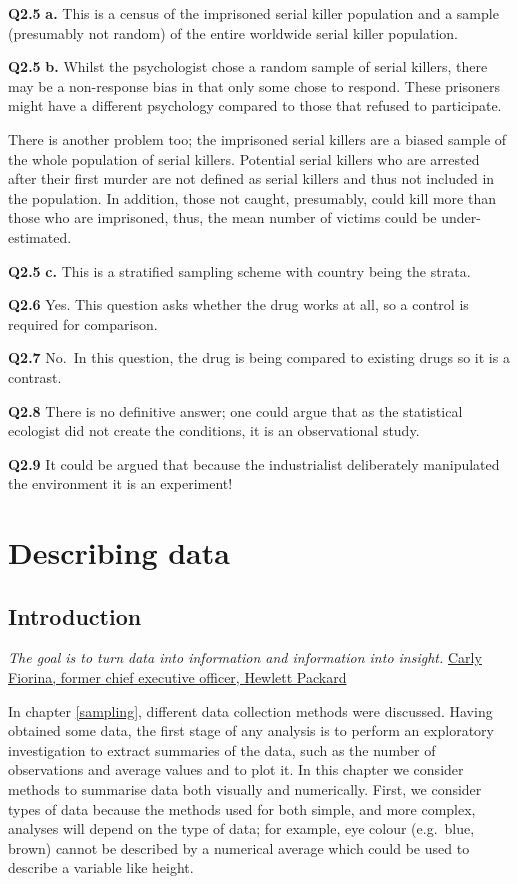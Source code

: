 \documentclass[
  oneside]{krantz}
\begin{document}
\textbf{Q2.5} \textbf{a.} This is a census of the imprisoned serial killer population and a sample (presumably not random) of the entire worldwide serial killer population.

\textbf{Q2.5} \textbf{b.} Whilst the psychologist chose a random sample of serial killers, there may be a non-response bias in that only some chose to respond. These prisoners might have a different psychology compared to those that refused to participate.

There is another problem too; the imprisoned serial killers are a biased sample of the whole population of serial killers. Potential serial killers who are arrested after their first murder are not defined as serial killers and thus not included in the population. In addition, those not caught, presumably, could kill more than those who are imprisoned, thus, the mean number of victims could be under-estimated.

\textbf{Q2.5} \textbf{c.} This is a stratified sampling scheme with country being the strata.

\textbf{Q2.6} Yes. This question asks whether the drug works at all, so a control is required for comparison.

\textbf{Q2.7} No.~In this question, the drug is being compared to existing drugs so it is a contrast.

\textbf{Q2.8} There is no definitive answer; one could argue that as the statistical ecologist did not create the conditions, it is an observational study.

\textbf{Q2.9} It could be argued that because the industrialist deliberately manipulated the environment it is an experiment!

\hypertarget{describedata}{%
\chapter{Describing data}\label{describedata}}

\hypertarget{INTdata}{%
\section{Introduction}\label{INTdata}}

\emph{The goal is to turn data into information and information into insight.}
\href{http://www.hp.com/hpinfo/execteam/speeches/fiorina/04openworld.html}{Carly Fiorina, former chief executive officer, Hewlett Packard}

In chapter \ref{sampling}, different data collection methods were discussed. Having obtained some data, the first stage of any analysis is to perform an exploratory investigation to extract summaries of the data, such as the number of observations and average values and to plot it. In this chapter we consider methods to summarise data both visually and numerically. First, we consider types of data because the methods used for both simple, and more complex, analyses will depend on the type of data; for example, eye colour (e.g.~blue, brown) cannot be described by a numerical average which could be used to describe a variable like height.
\end{document}
